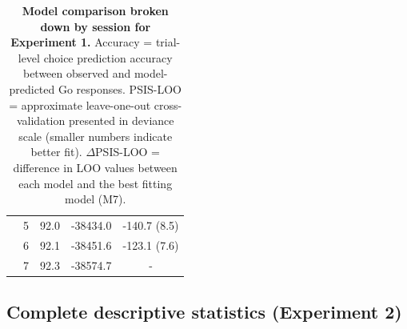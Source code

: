\documentclass[a4paper,12pt]{article}
\begin{document}
\begin{refsection}[supp]
\begin{table}[h!]
\begin{tabular}{lcccr}
         & 5 & 92.0 & -38434.0 & -140.7 (8.5) \\
         & 6 & 92.1 & -38451.6 & -123.1 (7.6) \\
         & 7 & 92.3 & -38574.7 & \multicolumn{1}{c}{-} \\
         \bottomrule
    \end{tabular}
    \caption{{\bf Model comparison broken down by session for Experiment 1.} Accuracy = trial-level choice prediction accuracy between observed and model-predicted Go responses. PSIS-LOO = approximate leave-one-out cross-validation presented in deviance scale (smaller numbers indicate better fit). \break $\Delta$PSIS-LOO = difference in LOO values between each model and the best fitting model (M7).}
    \label{tab:exp1_mc_full}
\end{table}

\clearpage
\subsection*{Complete descriptive statistics (Experiment 2)}


\end{refsection}
\end{document}
